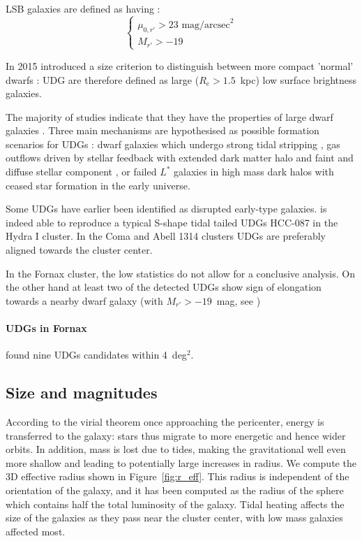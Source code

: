 LSB galaxies are defined as having \citep{Venhola2017}:
\begin{equation}
\begin{cases}
 \mu_{0,r'} > 23 \mbox{ mag/arcsec}^2\\
 M_{r'} > -19
\end{cases}
\end{equation}

In 2015 \citet{VanDokkum2015} introduced a size criterion to distinguish between more compact 'normal' dwarfs \citep{Sales2021}:
UDG are therefore defined as large ($R_e > 1.5$~kpc) low surface brightness galaxies.

The majority of studies indicate that they have the properties of large dwarf galaxies \citep{Sandage1984, Roman2017, Venhola2017, Saifollahi2021}.
Three main mechanisms are hypothesised as possible formation scenarios for UDGs \citep{Rong2020}:
dwarf galaxies which undergo strong tidal stripping \citep{Venhola2017, Carleton2018, Rong2020a},
gas outflows driven by stellar feedback with extended dark matter halo and faint and diffuse stellar component \citep{DiCintio2017, ManceraPina2019},
or failed $L^*$ galaxies in high mass dark halos with ceased star formation in the early universe.

Some UDGs have earlier been identified as disrupted early-type galaxies.
\citet{Koch2012} is indeed able to reproduce a typical S-shape tidal tailed UDGs HCC-087 in the Hydra I cluster. 
In the Coma and Abell 1314 clusters \citep{Yagi2016, ManceraPina2019} UDGs are preferably aligned towards the cluster center.

In the Fornax cluster, the low statistics do not allow for a conclusive analysis.
On the other hand at least two of the detected UDGs show sign of elongation towards a nearby dwarf galaxy (with $M_{r'} > -19$~mag, see \citet{Venhola2017})

\paragraph{UDGs in Fornax}
\citet{Venhola2017} found nine UDGs candidates within 4~deg$^2$. 
 
\subsection{Size and magnitudes}
According to the virial theorem %
once approaching the pericenter, energy is transferred to the galaxy: stars thus migrate to more energetic and hence wider orbits.
In addition, mass is lost due to tides, making the gravitational well even more shallow and leading to potentially large increases in radius.
We compute the 3D effective radius shown in Figure~\ref{fig:r_eff}.
This radius is independent of the orientation of the galaxy, and it has been computed as the radius of the sphere which contains half the total luminosity of the galaxy.
Tidal heating affects the size of the galaxies as they pass near the cluster center, with low mass galaxies affected most.

